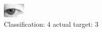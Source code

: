 \begin{figure}[h!]
\begin{center}
\includegraphics[width=0.60\columnwidth]{figures/ID192_class_4_target_3.png}
\end{center}
\caption{ Classification: 4 actual target: 3}
\label{fig:ID192_class_4_target_3}
\end{figure}
